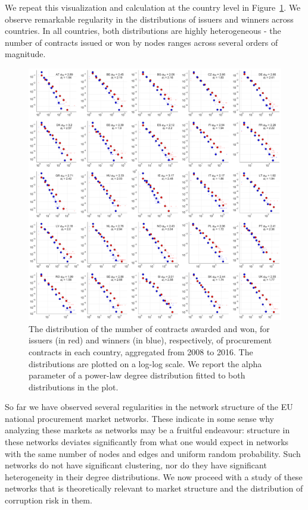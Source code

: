 We repeat this visualization and calculation at the country level in Figure~\ref{fig:national_dists}. We observe remarkable regularity in the distributions of issuers and winners across countries. In all countries, both distributions are highly heterogeneous - the number of contracts issued or won by nodes ranges across several orders of magnitude. 

\begin{figure}[!t]
\centering
  \includegraphics[width=\textwidth]{images/ted_networks/df_eu_national_dists.pdf}
  \caption[Contract distributions of issuers and winners, Country-level.]{The distribution of the number of contracts awarded and won, for issuers (in red) and winners (in blue), respectively, of procurement contracts in each country, aggregated from 2008 to 2016. The distributions are plotted on a log-log scale. We report the alpha parameter of a power-law degree distribution fitted to both distributions in the plot.}
  \label{fig:national_dists}
\end{figure}

So far we have observed several regularities in the network structure of the EU national procurement market networks. These indicate in some sense why analyzing these markets as networks may be a fruitful endeavour: structure in these networks deviates significantly from what one would expect in networks with the same number of nodes and edges and uniform random probability. Such networks do not have significant clustering, nor do they have significant heterogeneity in their degree distributions. We now proceed with a study of these networks that is theoretically relevant to market structure and the distribution of corruption risk in them.


